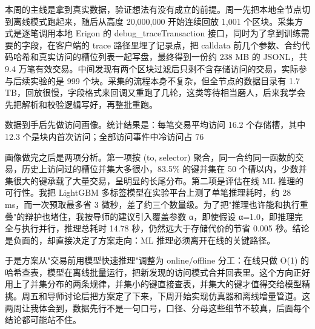 \documentclass[UTF8,fontset=fandol]{ctexart}
\begin{document}

本周的主线是拿到真实数据，验证想法有没有成立的前提。周一先把本地全节点切到离线模式跑起来，随后从高度 20,000,000 开始连续回放 1,001 个区块。采集方式是逐笔调用本地 Erigon 的 debug\_traceTransaction 接口，同时为了拿到训练需要的字段，在客户端的 trace 路径里埋了记录点，把 calldata 前几个参数、合约代码哈希和真实访问的槽位列表一起写盘，最终得到一份约 238 MB 的 JSONL，共 9.4 万笔有效交易。中间发现有两个区块过滤后只剩不含存储访问的交易，实际参与后续实验的是 999 个块。采集的流程本身不复杂，但全节点的数据目录有 1.7 TB，回放很慢，字段格式来回调又重跑了几轮，这类等待相当磨人，后来我学会先把解析和校验逻辑写好，再整批重跑。

数据到手后先做访问画像。统计结果是：每笔交易平均访问 16.2 个存储槽，其中 12.3 个是块内首次访问；全部访问事件中冷访问占 76%

画像做完之后是两项分析。第一项按 (to, selector) 聚合，同一合约同一函数的交易，历史上访问过的槽位并集大多很小，83.5\% 的键并集在 50 个槽以内，少数并集很大的键承载了大量交易，呈明显的长尾分布。第二项是评估在线 ML 推理的可行性。我把 LightGBM 多标签模型在实验平台上测了单笔推理耗时，约 28 ms，而一次预取最多省 3 微秒，差了约三个数量级。为了把"推理也许能和执行重叠"的辩护也堵住，我按导师的建议引入覆盖参数 α，即使假设 α=1.0，即推理完全与执行并行，推理总耗时 14.78 秒，仍然远大于存储代价的节省 0.005 秒。结论是负面的，却直接决定了方案走向：ML 推理必须离开在线的关键路径。

于是方案从"交易前用模型快速推理"调整为 online/offline 分工：在线只做 O(1) 的哈希查表，模型在离线批量运行，把新发现的访问模式合并回表里。这个方向正好用上了并集分布的两条规律，并集小的键直接查表，并集大的键才值得交给模型精挑。周五和导师讨论后把方案定了下来，下周开始实现仿真器和离线增量管道。这两周让我体会到，数据先行不是一句口号，口径、分母这些细节不较真，后面每个结论都可能站不住。
\end{document}
